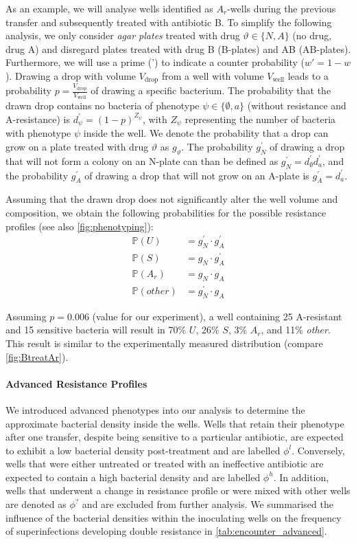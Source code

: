 As an example, we will analyse wells identified as \( A_r \)-wells during the previous transfer and subsequently treated with antibiotic B.
To simplify the following analysis, we only consider \textit{agar plates} treated with drug  $\vartheta \in \{N, A\}$ (no drug, drug A)  and disregard plates treated with drug B (B-plates) and AB (AB-plates).
Furthermore, we will use a prime (') to indicate a counter probability ($w' = 1-w$).
Drawing a drop with volume \( V_{\text{drop}} \) from a well with volume \( V_{\text{well}} \) leads to a probability \( p = \frac{V_{\text{drop}}}{V_{\text{well}}} \) of drawing a specific bacterium.
The probability that the drawn drop contains no bacteria of phenotype  \( \psi \in \{\emptyset, a\}\) (without resistance and A-resistance)  is \( d_\psi^\prime = (1-p)^{Z_\psi} \), with \( Z_\psi \) representing the number of bacteria with phenotype \( \psi\)  inside the well.
We denote the probability that a drop can grow on a plate treated with drug $\vartheta$ as $g_\vartheta$.
The probability $g_N^\prime$ of drawing a drop that will not form a colony on an N-plate can than be defined as \( g_N^\prime = d^\prime_\emptyset d^\prime_a \), and the probability \( g_A^\prime \) of drawing a drop that will not grow on an A-plate is \( g_A^\prime = d^\prime_a \).

Assuming that the drawn drop does not significantly alter the well volume and composition, we obtain the following probabilities for the possible resistance profiles (see also \autoref{fig:phenotyping}):
\begin{align*}
\mathbb{P}(U) &= g_N^\prime \cdot g_A^\prime \\
\mathbb{P}(S) &= g_N \cdot g_A^\prime \\
\mathbb{P}(A_r) &= g_N \cdot g_A \\
\mathbb{P}(other) &= g_N^\prime \cdot g_A
\end{align*}

Assuming \( p = 0.006 \) (value for our experiment), a well containing 25 A-resistant and 15 sensitive bacteria will result in 70\% \( U \), 26\% \( S \), 3\% \( A_r \), and 11\% \textit{other}.
This result is similar to the experimentally measured distribution (compare \autoref{fig:BtreatAr}).

\paragraph{Advanced Resistance Profiles}
We introduced advanced phenotypes into our analysis to determine the approximate bacterial density inside the wells.
Wells that retain their phenotype after one transfer, despite being sensitive to a particular antibiotic, are expected to exhibit a low bacterial density post-treatment and are labelled $\phi^l$.
Conversely, wells that were either untreated or treated with an ineffective antibiotic are expected to contain a high bacterial density and are labelled $\phi^h$.
In addition, wells that underwent a change in resistance profile or were mixed with other wells are denoted as $\phi^?$ and are excluded from further analysis.
We summarised the influence of the bacterial densities within the inoculating wells on the frequency of superinfections developing double resistance in \autoref{tab:encounter_advanced}.

